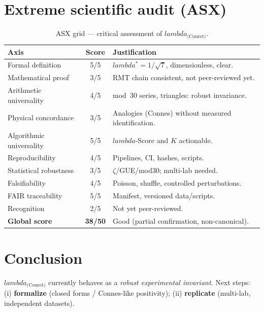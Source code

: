 \documentclass[11pt,a4paper]{article}
\def\lambda{lambda}%
\begin{document}
\section{Extreme scientific audit (ASX)}
\begin{table}[h]
\centering
\small
\begin{tabular}{p{4.8cm} c p{9cm}}
\toprule
\textbf{Axis} & \textbf{Score} & \textbf{Justification}\\ \midrule
Formal definition & 5/5 & $\lambda^\ast = 1/\sqrt{7}$, dimensionless, clear.\\
Mathematical proof & 3/5 & RMT chain consistent, not peer-reviewed yet.\\
Arithmetic universality & 4/5 & mod~30 series, triangles: robust invariance.\\
Physical concordance & 3/5 & Analogies (Connes) without measured identification.\\
Algorithmic universality & 5/5 & $\lambda$-Score and $K$ actionable.\\
Reproducibility & 4/5 & Pipelines, CI, hashes, scripts.\\
Statistical robustness & 3/5 & $\zeta$/GUE/mod30; multi-lab needed.\\
Falsifiability & 4/5 & Poisson, shuffle, controlled perturbations.\\
FAIR traceability & 5/5 & Manifest, versioned data/scripts.\\
Recognition & 2/5 & Not yet peer-reviewed.\\ \midrule
\textbf{Global score} & \textbf{38/50} & Good (partial confirmation, non-canonical).\\
\bottomrule
\end{tabular}
\caption{ASX grid — critical assessment of $\lambda_{\text{(Couret)}}$.}
\end{table}

\section{Conclusion}
$\lambda_{\text{(Couret)}}$ currently behaves as a \emph{robust experimental invariant}.
Next steps: (i) \textbf{formalize} (closed forms / Connes-like positivity); (ii) \textbf{replicate} (multi-lab, independent datasets).
\end{document}
